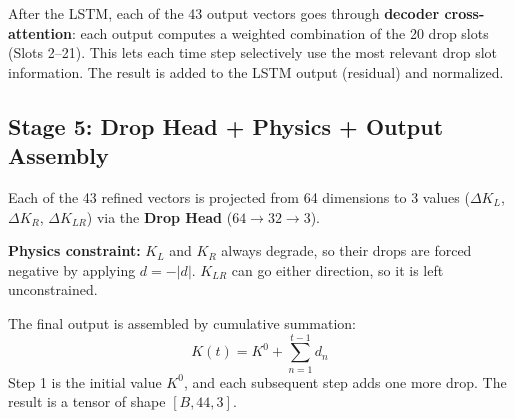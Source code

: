 \documentclass[11pt,a4paper]{article}
\begin{document}
After the LSTM, each of the 43 output vectors goes through \textbf{decoder cross-attention}: each output computes a weighted combination of the 20 drop slots (Slots 2--21). This lets each time step selectively use the most relevant drop slot information. The result is added to the LSTM output (residual) and normalized.

\subsection*{Stage 5: Drop Head + Physics + Output Assembly}
Each of the 43 refined vectors is projected from 64 dimensions to 3 values ($\Delta K_L$, $\Delta K_R$, $\Delta K_{LR}$) via the \textbf{Drop Head} ($64 \to 32 \to 3$).

\textbf{Physics constraint:} $K_L$ and $K_R$ always degrade, so their drops are forced negative by applying $d = -|d|$. $K_{LR}$ can go either direction, so it is left unconstrained.

The final output is assembled by cumulative summation:
$$K(t) = K^0 + \sum_{n=1}^{t-1} d_n$$
Step 1 is the initial value $K^0$, and each subsequent step adds one more drop. The result is a tensor of shape $[B, 44, 3]$.
\end{document}

